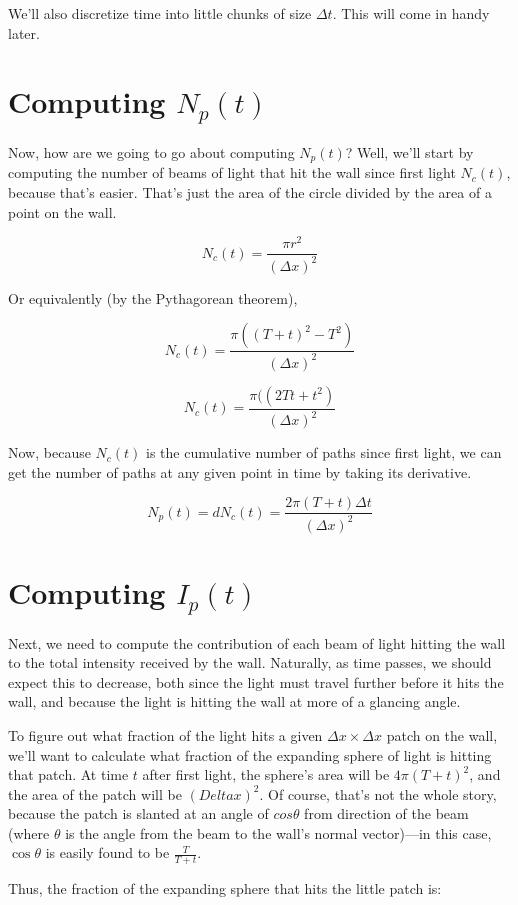 \documentclass[11pt]{article}
\begin{document}
We'll also discretize time into little chunks of size $\Delta t$. This will come in handy later.

\section{Computing $N_p(t)$}

Now, how are we going to go about computing $N_p(t)$? Well, we'll start by computing the number of beams of light that hit the wall since first light $N_c(t)$, because that's easier. That's just the area of the circle divided by the area of a point on the wall.

$$N_c(t) = \frac{\pi r^2}{(\Delta x)^2}$$

Or equivalently (by the Pythagorean theorem),

$$N_c(t) = \frac{\pi((T+t)^2 - T^2)}{(\Delta x)^2}$$

$$N_c(t) = \frac{\pi((2Tt + t^2)}{(\Delta x)^2}$$

Now, because $N_c(t)$ is the cumulative number of paths since first light, we can get the number of paths at any given point in time by taking its derivative.

$$N_p(t) = dN_c(t) = \frac{2\pi(T+t)\Delta t}{(\Delta x)^2}$$

\section{Computing $I_p(t)$}

Next, we need to compute the contribution of each beam of light hitting the wall to the total intensity received by the wall. Naturally, as time passes, we should expect this to decrease, both since the light must travel further before it hits the wall, and because the light is hitting the wall at more of a glancing angle. 

To figure out what fraction of the light hits a given $\Delta x \times \Delta x$ patch on the wall, we'll want to calculate what fraction of the expanding sphere of light is hitting that patch. At time $t$ after first light, the sphere's area will be $4\pi(T+t)^2$, and the area of the patch will be $(Delta x)^2$. Of course, that's not the whole story, because the patch is slanted at an angle of $cos \theta$ from direction of the beam (where $\theta$ is the angle from the beam to the wall's normal vector)---in this case, $\cos \theta$ is easily found to be $\frac{T}{T+t}$.

Thus, the fraction of the expanding sphere that hits the little patch is:
\end{document}
